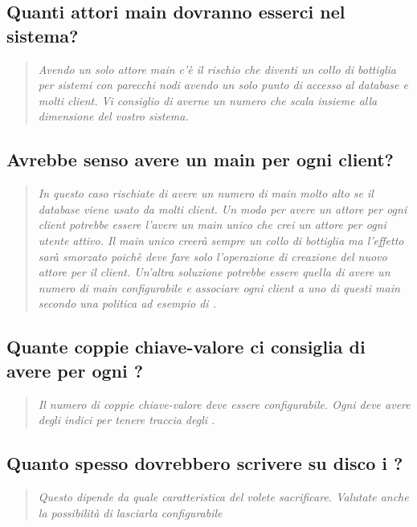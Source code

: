 \documentclass{scalatekids-article}
\begin{document}
\subsection{Quanti attori main dovranno esserci nel sistema?}
\begin{quote}
  \textit{Avendo un solo attore main c'è il rischio che diventi un collo di bottiglia per sistemi con parecchi nodi avendo un solo punto di accesso al database e molti client. Vi consiglio di averne un numero che scala insieme alla dimensione del vostro sistema.\\}
\end{quote}
\subsection{Avrebbe senso avere un main per ogni client?}
\begin{quote}
  \textit{In questo caso rischiate di avere un numero di main molto alto se il database viene usato da molti client. Un modo per avere un attore per ogni client potrebbe essere l'avere un main unico che crei un attore per ogni utente attivo. Il main unico creerà sempre un collo di bottiglia ma l'effetto sarà smorzato poichè deve fare solo l'operazione di creazione del nuovo attore per il client. Un'altra soluzione potrebbe essere quella di avere un numero di main configurabile e associare ogni client a uno di questi main secondo una politica ad esempio di .\\}
\end{quote}
\subsection{Quante coppie chiave-valore ci consiglia di avere per ogni ?}
\begin{quote}
  \textit{Il numero di coppie chiave-valore deve essere configurabile. Ogni  deve avere degli indici per tenere traccia degli .\\}
\end{quote}
\subsection{Quanto spesso dovrebbero scrivere su disco i ?}
\begin{quote}
  \textit{Questo dipende da quale caratteristica del  volete sacrificare. Valutate anche la possibilità di lasciarla configurabile\\}
\end{quote}
\end{document}
